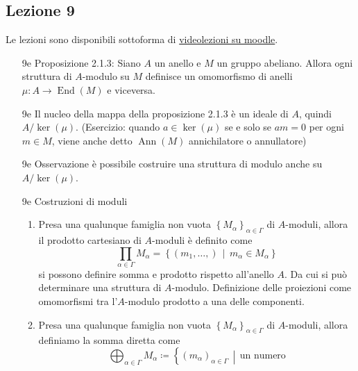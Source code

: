 \documentclass[italian]{article}
\begin{document}
    \subsection{Lezione 9}

    Le lezioni sono disponibili sottoforma di 
    \href{https://didatticaonline.unitn.it/dol/course/view.php?id=23268}{videolezioni
    su moodle}.
    
    \begin{enumerate}
      \item[9e] Proposizione 2.1.3\cite{vergura}: Siano $A$ un anello e $M$ 
        un gruppo abeliano. Allora ogni struttura di $A$-modulo su $M$ 
        definisce un omomorfismo di anelli $\mu \colon A \to 
        \operatorname{End}(M)$ e viceversa.
      \item[9e] Il nucleo della mappa della proposizione 2.1.3 è un ideale di
        $A$, quindi $A/\ker(\mu)$. (Esercizio: quando $a \in \ker(\mu)$ se
          e solo se $am = 0$ per ogni $m \in M$, viene anche detto
        $\operatorname{Ann}(M)$ annichilatore o annullatore)
      \item[9e] Osservazione è possibile costruire una struttura di modulo anche
        su $A/\ker(\mu)$.
      \item[9e] Costruzioni di moduli
        \begin{enumerate}
          \item Presa una qualunque famiglia non vuota $\left\{ M_\alpha
            \right\}_{\alpha \in \Gamma}$ di $A$-moduli, allora il prodotto 
            cartesiano di $A$-moduli è definito come 
            \begin{equation*}
              \prod_{\alpha \in \Gamma} M_\alpha = \left\{ (m_1, \dots,)
              \,\middle|\, m_\alpha \in M_\alpha \right\}
            \end{equation*}
            si possono definire somma e prodotto rispetto all'anello $A$. Da cui
            si può determinare una struttura di $A$-modulo. Definizione delle
            proiezioni come omomorfismi tra l'$A$-modulo prodotto a una delle
            componenti.
          \item Presa una qualunque famiglia non vuota $\left\{ M_\alpha
            \right\}_{\alpha \in \Gamma}$ di $A$-moduli, allora definiamo la
            somma diretta come 
            \begin{equation*}
              \bigoplus_{\alpha \in \Gamma} M_\alpha \coloneqq \left\{
                (m_\alpha)_{\alpha \in \Gamma} \,\middle|\, \text{un numero
}
\end{equation*}
\end{enumerate}
\end{enumerate}
\end{document}
